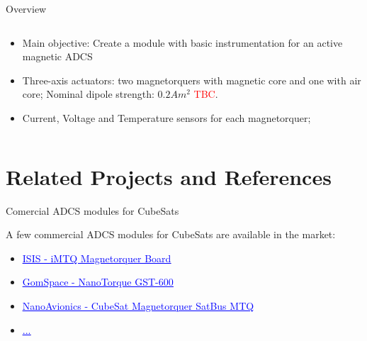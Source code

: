 \documentclass{beamer}
\begin{document}
    \begin{frame}{Overview}

    \begin{columns}[t]
        \begin{column}[t]{0.9\textwidth}
            \begin{itemize}
                \item Main objective: Create a module with
basic instrumentation for an active
magnetic ADCS
                \vspace{0.3cm}
                \item Three-axis actuators: two
magnetorquers with
magnetic core and one with
air core; Nominal dipole
strength: $0.2 Am^2$ \textcolor{red}{TBC}.
                \vspace{0.3cm}
                \item Current, Voltage and Temperature sensors for each magnetorquer;

            \end{itemize}
        \end{column}
    \end{columns}

\end{frame}

    \section{Related Projects and References}

        
        
\begin{frame}{Comercial ADCS modules for CubeSats}

    A few commercial ADCS modules for CubeSats are available in the market:

    \begin{itemize}
        \item \href{https://www.isispace.nl/product/isis-magnetorquer-board/}{\textcolor{blue}{\underline{ISIS - iMTQ Magnetorquer Board}}}
        \vspace{0.4cm}
        \item \href{https://gomspace.com/shop/subsystems/attitude-orbit-control-systems/nanotorque-gst-600.aspx}{\textcolor{blue}{\underline{GomSpace - NanoTorque GST-600}}}
        \vspace{0.4cm}
        \item \href{https://nanoavionics.com/cubesat-components/cubesat-magnetorquer-satbus-mtq/}{\textcolor{blue}{\underline{NanoAvionics - CubeSat Magnetorquer SatBus MTQ}}}
        \vspace{0.4cm}
        \item \href{}{\textcolor{blue}{\underline{...}}}
    \end{itemize}

\end{frame}
\end{document}
